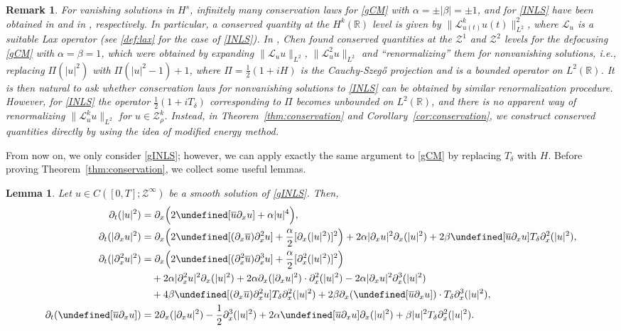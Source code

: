 \documentclass{amsart}
\newtheorem{lemma}[proposition]{Lemma}
\newtheorem{remark}{Remark}[section]
\numberwithin{equation}{section}
\newcommand{\R}{\mathbb{R}}
\newcommand{\Td}{T_{\delta}}
\let\Im=\undefined\DeclareMathOperator{\Im}{Im}
\begin{document}
\begin{remark}
For vanishing solutions in $H^s$, infinitely many conservation laws for \eqref{gCM} with $\alpha=\pm |\beta|=\pm 1$,  and for \eqref{INLS} have been obtained in \cite{GL} and in \cite{P,CFL}, respectively.
In particular, a conserved quantity at the $H^k(\R)$ level is given by $\| \mathcal{L}_{u(t)}^ku(t)\|_{L^2}^2$, where $\mathcal{L}_u$ is a suitable Lax operator (see \eqref{def:lax} for the case of \eqref{INLS}).
In \cite[Lemma~3.5]{Chen}, Chen found conserved quantities at the $\mathcal{Z}^1$ and $\mathcal{Z}^2$ levels for the defocusing \eqref{gCM} with $\alpha=\beta=1$, which were obtained by expanding $\| \mathcal{L}_uu\|_{L^2}$, $\| \mathcal{L}_u^2u\|_{L^2}$ and ``renormalizing'' them for nonvanishing solutions, i.e., replacing $\Pi(|u|^2)$ with $\Pi(|u|^2-1)+1$, where $\Pi=\frac12(1+iH)$ is the Cauchy-Szeg\H{o} projection and is a bounded operator on $L^2(\R)$.
It is then natural to ask whether conservation laws for nonvanishing solutions to \eqref{INLS} can be obtained by similar renormalization procedure.
However, for \eqref{INLS} the operator $\frac12(1+i\Td)$ corresponding to $\Pi$ becomes unbounded on $L^2(\R)$, and there is no apparent way of renormalizing $\| \mathcal{L}_u^ku\|_{L^2}$ for $u\in \mathcal{Z}^k_\rho$.
Instead, in Theorem~\ref{thm:conservation} and Corollary~\ref{cor:conservation}, we construct conserved quantities directly by using the idea of modified energy method.
\end{remark}


\bigskip
From now on, we only consider \eqref{gINLS}; however, we can apply exactly the same argument to \eqref{gCM} by replacing $\Td$ with $H$.
Before proving Theorem~\ref{thm:conservation}, we collect some useful lemmas.

\begin{lemma}\label{lem:tderi}
Let $u\in C([0,T];\mathcal{Z}^\infty)$ be a smooth solution of \eqref{gINLS}.
Then, 
\begin{align*}
\partial_t(|u|^2)&= \partial_x\Big( 2\Im[\overline{u}\partial_xu] +\alpha |u|^4\Big) ,\\
\partial_t(|\partial_xu|^2)&= \partial_x\Big( 2\Im[(\partial_x\overline{u})\partial_x^2u] +\frac{\alpha}{2}[\partial_x(|u|^2)]^2\Big) +2\alpha |\partial_xu|^2\partial_x(|u|^2) +2\beta \Im[\overline{u}\partial_xu] \Td \partial_x^2(|u|^2),\\
\partial_t(|\partial_x^2u|^2)&= \partial_x\Big( 2\Im[(\partial_x^2\overline{u})\partial_x^3u] +\frac{\alpha}{2}[\partial_x^2(|u|^2)]^2\Big) \\
&\quad +2\alpha |\partial_x^2u|^2\partial_x(|u|^2) +2\alpha \partial_x(|\partial_xu|^2)\cdot \partial_x^2(|u|^2) -2\alpha |\partial_xu|^2\partial_x^3(|u|^2) \\
&\quad +4\beta \Im [(\partial_x\overline{u})\partial_x^2u] \Td \partial_x^2(|u|^2) +2\beta \partial_x(\Im[\overline{u}\partial_xu])\cdot \Td\partial_x^3(|u|^2) ,\\
\partial_t(\Im [\overline{u}\partial_xu])&= 2\partial_x(|\partial_xu|^2) -\frac12 \partial_x^3(|u|^2) +2\alpha \Im[\overline{u}\partial_xu] \partial_x(|u|^2) +\beta |u|^2\Td \partial_x^2(|u|^2) . 
\end{align*}
\end{lemma}
\end{document}
